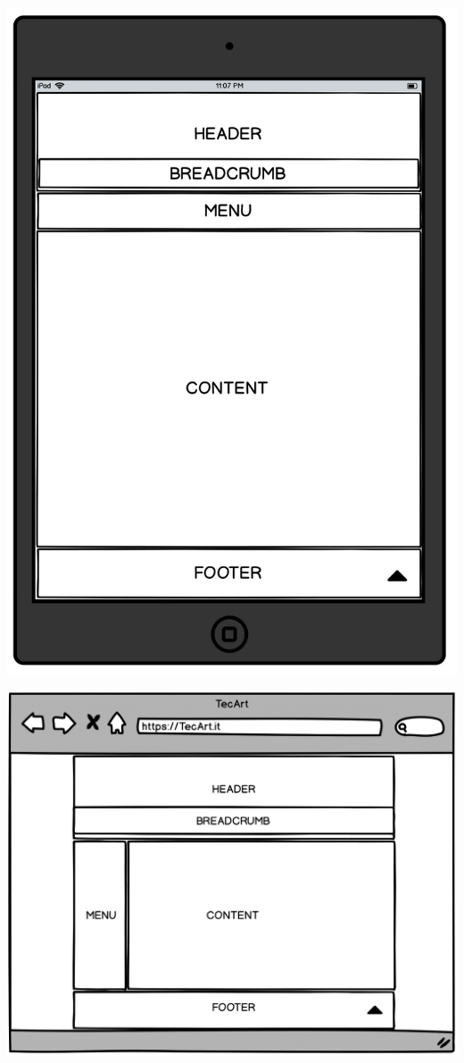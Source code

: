 \begin{center}
	\includegraphics[scale=0.13]{img/Tablet}
\end{center}

\begin{center}
	\includegraphics[width=\textwidth]{img/Desktop}
\end{center}


